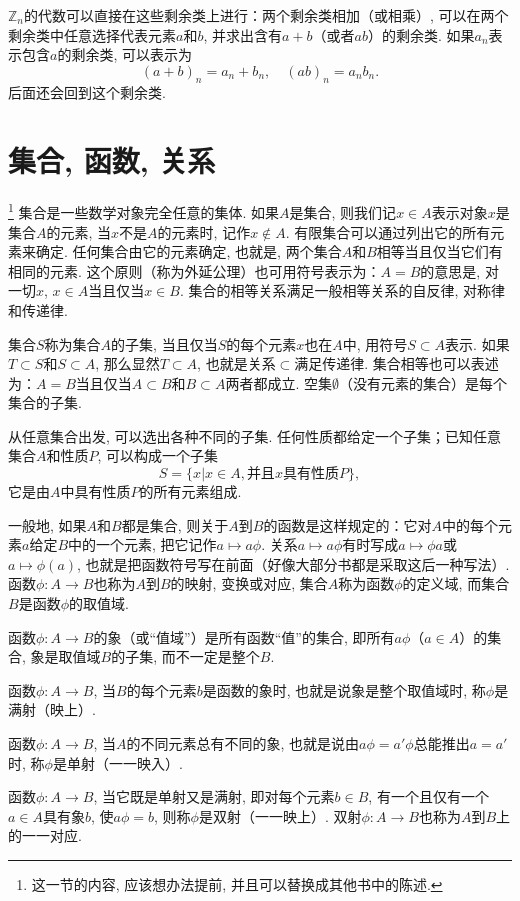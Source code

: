 $\mathbb{Z}_n$的代数可以直接在这些剩余类上进行：两个剩余类相加（或相乘）, 可以在两个剩余类中任意选择代表元素$a$和$b$, 并求出含有$a+b$（或者$ab$）的剩余类. 如果$a_n$表示包含$a$的剩余类, 可以表示为
\[
(a+b)_n = a_n + b_n, \quad (ab)_n = a_nb_n.
\]
后面还会回到这个剩余类. 


\section{集合, 函数, 关系}\label{subsection0010111}\footnote{这一节的内容, 应该想办法提前, 并且可以替换成其他书中的陈述. }
集合是一些数学对象完全任意的集体. 如果$A$是集合, 则我们记$x \in A$表示对象$x$是集合$A$的元素, 当$x$不是$A$的元素时, 记作$x \not\in A$. 有限集合可以通过列出它的所有元素来确定. 任何集合由它的元素确定, 也就是, 两个集合$A$和$B$相等当且仅当它们有相同的元素. 这个原则（称为外延公理）也可用符号表示为：$A=B$的意思是, 对一切$x$, $x \in A$当且仅当$x \in B$. 集合的相等关系满足一般相等关系的自反律, 对称律和传递律. 

集合$S$称为集合$A$的子集, 当且仅当$S$的每个元素$x$也在$A$中, 用符号$S \subset A$表示. 如果$T \subset S$和$S \subset A$, 那么显然$T \subset A$, 也就是关系$\subset$满足传递律. 集合相等也可以表述为：$A=B$当且仅当$A \subset B$和$B \subset A$两者都成立. 空集$\emptyset$（没有元素的集合）是每个集合的子集. 

从任意集合出发, 可以选出各种不同的子集. 任何性质都给定一个子集；已知任意集合$A$和性质$P$, 可以构成一个子集
\[
S = \{x | x \in A, \text{并且}x\text{具有性质}P\},
\]
它是由$A$中具有性质$P$的所有元素组成. 

一般地, 如果$A$和$B$都是集合, 则关于$A$到$B$的函数是这样规定的：它对$A$中的每个元素$a$给定$B$中的一个元素, 把它记作$a \mapsto a\phi$. 关系$a \mapsto a\phi$有时写成$a \mapsto \phi{}a$或$a \mapsto \phi(a)$, 也就是把函数符号写在前面（好像大部分书都是采取这后一种写法）. 函数$\phi: A \to B$也称为$A$到$B$的映射, 变换或对应, 集合$A$称为函数$\phi$的定义域, 而集合$B$是函数$\phi$的取值域. 

函数$\phi: A \to B$的象（或“值域”）是所有函数“值”的集合, 即所有$a\phi$（$a \in A$）的集合, 象是取值域$B$的子集, 而不一定是整个$B$. 

函数$\phi:A \to B$, 当$B$的每个元素$b$是函数的象时, 也就是说象是整个取值域时, 称$\phi$是满射（映上）. 

函数$\phi:A \to B$, 当$A$的不同元素总有不同的象, 也就是说由$a\phi=a'\phi$总能推出$a=a'$时, 称$\phi$是单射（一一映入）. 

函数$\phi:A \to B$, 当它既是单射又是满射, 即对每个元素$b \in B$, 有一个且仅有一个$a \in A$具有象$b$, 使$a\phi = b$, 则称$\phi$是双射（一一映上）. 双射$\phi:A \to B$也称为$A$到$B$上的一一对应. 

